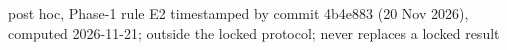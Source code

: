 post hoc, Phase-1 rule E2 timestamped by commit 4b4e883 (20 Nov 2026), computed 2026-11-21; outside the locked protocol; never replaces a locked result
